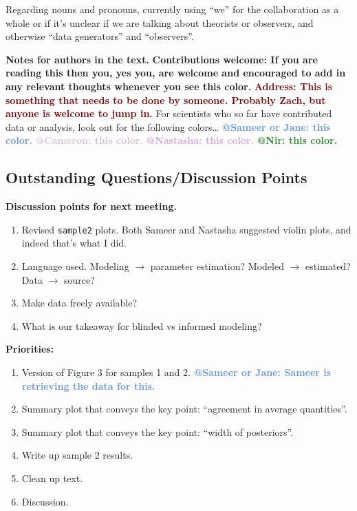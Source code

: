 \documentclass[fleqn,usenatbib]{mnras}
\makeatletter
\newcommand{\thoughts}[1]{\textcolor{BurntOrange}{\textbf{Contributions welcome: #1}}}
\newcommand{\todo}[1]{\textcolor{Maroon}{\textbf{Address: #1}}}
\newcommand{\atsameer}[1]{\textcolor{CornflowerBlue}{\textbf{@Sameer or Jane: #1}}}
\newcommand{\atcameron}[1]{\textcolor{Thistle}{\textbf{@Cameron: #1}}}
\newcommand{\atnastasha}[1]{\textcolor{Plum}{\textbf{@Nastasha: #1}}}
\newcommand{\atnir}[1]{\textcolor{ForestGreen}{\textbf{@Nir: #1}}}
\makeatother
\begin{document}
Regarding nouns and pronouns, currently using ``we'' for the collaboration as a whole or if it's unclear if we are talking about theorists or observers, and otherwise ``data generators'' and ``observers''. 

\textbf{Notes for authors in the text.}
\thoughts{If you are reading this then you, yes you, are welcome and encouraged to add in any relevant thoughts whenever you see this color.}
\todo{This is something that needs to be done by someone. Probably Zach, but anyone is welcome to jump in.}
For scientists who so far have contributed data or analysis, look out for the following colors\ldots
\atsameer{this color.}
\atcameron{this color.}
\atnastasha{this color.}
\atnir{this color.}

\subsection{Outstanding Questions/Discussion Points}

\textbf{Discussion points for next meeting.}
\begin{enumerate}
    \item Revised \texttt{sample2} plots. Both Sameer and Nastasha suggested violin plots, and indeed that's what I did.
    \item Language used. Modeling $\rightarrow$ parameter estimation? Modeled $\rightarrow$ estimated? Data $\rightarrow$ source?
    \item Make data freely available?
    \item What is our takeaway for blinded vs informed modeling?
\end{enumerate}

\textbf{Priorities:}
\begin{enumerate}
    \item Version of Figure 3 for samples 1 and 2. \atsameer{Sameer is retrieving the data for this.}
    \item Summary plot that conveys the key point: ``agreement in average quantities''.
    \item Summary plot that conveys the key point: ``width of posteriors''.
    \item Write up sample 2 results.
    \item Clean up text.
    \item Discussion.
\end{enumerate}
\end{document}
